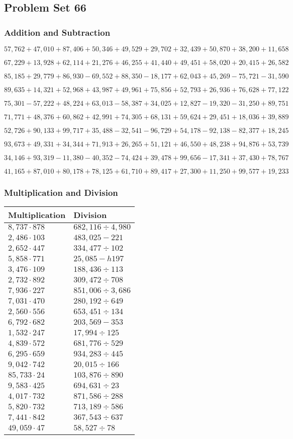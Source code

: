 \hypertarget{problem-set-66}{%
\subsection{Problem Set 66}\label{problem-set-66}}

\hypertarget{addition-and-subtraction-288}{%
\subsubsection{Addition and
Subtraction}\label{addition-and-subtraction-288}}

\(57,762+47,010+87,406+50,346+49,529+29,702+32,439+50,870+38,200+ 11,658\)

\(67,229+13,928+62,114+21,276+46,255+41,440+49,451+58,020+20,415+26,582\)

\(85,185+29,779+86,930-69,552+88,350-18,177+62,043+45,269-75,721-31,590\)

\(89,635+14,321+52,968+43,987+49,961+75,856+52,793+26,936+76,628+77,122\)

\(75,301-57,222+48,224+63,013-58,387+34,025+12,827-19,320-31,250+89,751\)

\(71,771+48,376+60,862+42,991+74,305+68,131+59,624+29,451+18,036+39,889\)

\(52,726+90,133+99,717+35,488-32,541-96,729+54,178-92,138-82,377+18,245\)

\(93,673+49,331+34,344+71,913+26,265+51,121+46,550+48,238+94,876+53,739\)

\(34,146+93,319-11,380-40,352-74,424+39,478+99,656-17,341+37,430+78,767\)

\(41,165+87,010+80,178+78,125+61,710+89,417+27,300+11,250+99,577+19,233\)

\hypertarget{multiplication-and-division-287}{%
\subsubsection{Multiplication and
Division}\label{multiplication-and-division-287}}

\begin{longtable}[]{@{}ll@{}}
\toprule
Multiplication & Division\tabularnewline
\midrule
\endhead
\(8,737\cdot878\) & \(682,116÷4,980\)\tabularnewline
\(2,486\cdot103\) & \(483,025 - 221\)\tabularnewline
\(2,652\cdot447\) & \(334,477÷102\)\tabularnewline
\(5,858\cdot771\) & \(25,085 -h 197\)\tabularnewline
\(3,476\cdot109\) & \(188,436÷113\)\tabularnewline
\(2,732\cdot892\) & \(309,472÷708\)\tabularnewline
\(7,936\cdot227\) & \(851,006÷3,686\)\tabularnewline
\(7,031\cdot470\) & \(280,192÷649\)\tabularnewline
\(2,560\cdot556\) & \(653,451÷134\)\tabularnewline
\(6,792\cdot682\) & \(203,569- 353\)\tabularnewline
\(1,532\cdot247\) & \(17,994÷125\)\tabularnewline
\(4,839\cdot572\) & \(681,776÷529\)\tabularnewline
\(6,295\cdot659\) & \(934,283÷445\)\tabularnewline
\(9,042\cdot742\) & \(20,015÷166\)\tabularnewline
\(85,733\cdot24\) & \(103,876÷890\)\tabularnewline
\(9,583\cdot425\) & \(694,631÷23\)\tabularnewline
\(4,017\cdot732\) & \(871,586÷288\)\tabularnewline
\(5,820\cdot732\) & \(713,189÷586\)\tabularnewline
\(7,441\cdot842\) & \(367,543÷637\)\tabularnewline
\(49,059\cdot47\) & \(58,527÷78\)\tabularnewline
\bottomrule
\end{longtable}

